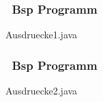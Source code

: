 \begin{frame}[t]%
  \frametitle{\stitle\ Bsp Programm}


{\getexercisefolder Ausdruecke1.java}
\end{frame}


\begin{frame}[t]%
  \frametitle{\stitle\ Bsp Programm}


{\getexercisefolder Ausdruecke2.java}
\end{frame}
